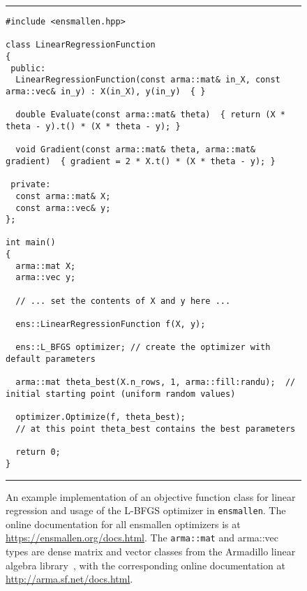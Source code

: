 \begin{figure}[!b]
\hrule
\vspace{1ex}
\centering
\begin{verbatim}
#include <ensmallen.hpp>

class LinearRegressionFunction
{
 public:
  LinearRegressionFunction(const arma::mat& in_X, const arma::vec& in_y) : X(in_X), y(in_y)  { }

  double Evaluate(const arma::mat& theta)  { return (X * theta - y).t() * (X * theta - y); }

  void Gradient(const arma::mat& theta, arma::mat& gradient)  { gradient = 2 * X.t() * (X * theta - y); }

 private:
  const arma::mat& X;
  const arma::vec& y;
};

int main()
{
  arma::mat X;
  arma::vec y;
  
  // ... set the contents of X and y here ...
  
  ens::LinearRegressionFunction f(X, y);

  ens::L_BFGS optimizer; // create the optimizer with default parameters

  arma::mat theta_best(X.n_rows, 1, arma::fill:randu);  // initial starting point (uniform random values)

  optimizer.Optimize(f, theta_best);
  // at this point theta_best contains the best parameters

  return 0;
}
\end{verbatim}
\hrule
\vspace*{-0.5em}
\caption{An example implementation of an objective function class for linear
regression and usage of the L-BFGS optimizer in {\tt ensmallen}.
The online documentation for all ensmallen optimizers
is at \mbox{\url{https://ensmallen.org/docs.html}}.
The {\tt arma::mat} and {arma::vec} types are 
dense matrix and vector classes
from the Armadillo linear algebra library~\cite{sanderson2016armadillo},
with the corresponding online documentation at \mbox{\url{http://arma.sf.net/docs.html}}.
}
\label{fig:lr_function}
\end{figure}
